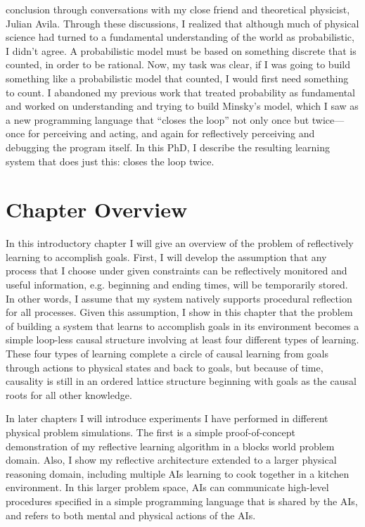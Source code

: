 conclusion through conversations with my close friend and theoretical
physicist, Julian Avila.  Through these discussions, I realized that
although much of physical science had turned to a fundamental
understanding of the world as probabilistic, I didn't agree.  A
probabilistic model must be based on something discrete that is
counted, in order to be rational.  Now, my task was clear, if I was
going to build something like a probabilistic model that counted, I
would first need something to count.  I abandoned my previous work
that treated probability as fundamental and worked on understanding
and trying to build Minsky's model, which I saw as a new programming
language that ``closes the loop'' not only once but twice---once for
perceiving and acting, and again for reflectively perceiving and
debugging the program itself.  In this PhD, I describe the resulting
learning system that does just this: closes the loop twice.

\section{Chapter Overview}

In this introductory chapter I will give an overview of the problem of
reflectively learning to accomplish goals.  First, I will develop the
assumption that any process that I choose under given constraints can
be reflectively monitored and useful information, e.g. beginning and
ending times, will be temporarily stored.  In other words, I assume
that my system natively supports procedural reflection for all
processes.  Given this assumption, I show in this chapter that the
problem of building a system that learns to accomplish goals in its
environment becomes a simple loop-less causal structure involving at
least four different types of learning.  These four types of learning
complete a circle of causal learning from goals through actions to
physical states and back to goals, but because of time, causality is
still in an ordered lattice structure beginning with goals as the
causal roots for all other knowledge.

In later chapters I will introduce experiments I have performed in
different physical problem simulations.  The first is a simple
proof-of-concept demonstration of my reflective learning algorithm in
a blocks world problem domain.  Also, I show my reflective
architecture extended to a larger physical reasoning domain, including
multiple AIs learning to cook together in a kitchen environment.
In this larger problem space, AIs can communicate high-level
procedures specified in a simple programming language that is shared
by the AIs, and refers to both mental and physical actions of the
AIs.

